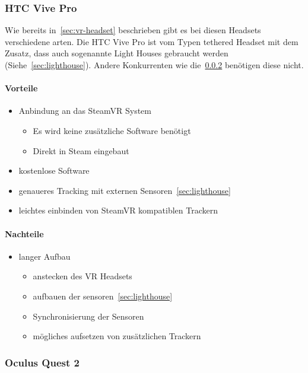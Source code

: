 \subsubsection{HTC Vive Pro}

Wie bereits in~\ref{sec:vr-headset} beschrieben gibt es bei diesen Headsets verschiedene arten.
Die HTC Vive Pro ist vom Typen tethered Headset mit dem Zusatz, dass auch sogenannte Light Houses gebraucht werden (Siehe~\ref{sec:lighthouse}).
Andere Konkurrenten wie die~\ref{sec:oculus-quest-2} benötigen diese nicht.

\paragraph{Vorteile}

\begin{itemize}
    \item Anbindung an das SteamVR System
    \begin{itemize}
        \item Es wird keine zusätzliche Software benötigt
        \item Direkt in Steam eingebaut
    \end{itemize}
    \item kostenlose Software
    \item genaueres Tracking mit externen Sensoren~\ref{sec:lighthouse}
    \item leichtes einbinden von SteamVR kompatiblen Trackern
\end{itemize}

\paragraph{Nachteile}

\begin{itemize}
    \item langer Aufbau
    \begin{itemize}
        \item anstecken des VR Headsets
        \item aufbauen der sensoren~\ref{sec:lighthouse}
        \item Synchronisierung der Sensoren
        \item mögliches aufsetzen von zusätzlichen Trackern
    \end{itemize}
\end{itemize}


\subsubsection{Oculus Quest 2}\label{sec:oculus-quest-2}


